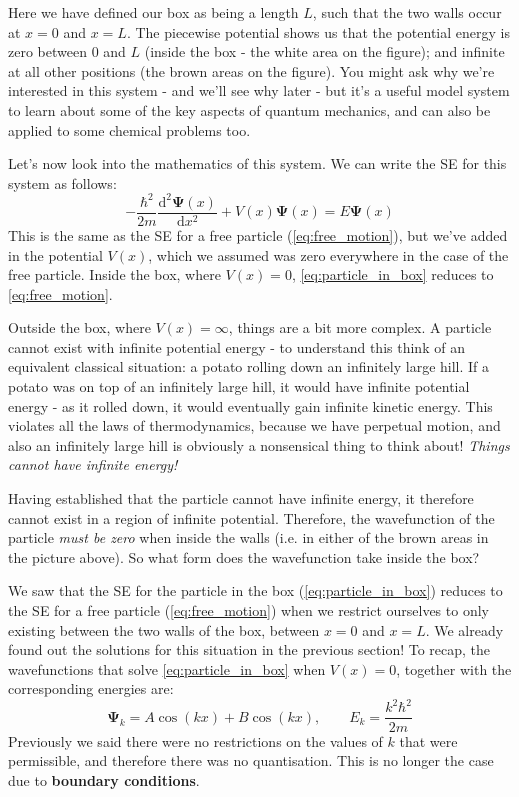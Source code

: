 \documentclass{memoir}[11pt,oneside,a4paper,openany]
\newcommand{\wf}{\ensuremath{\bm{\Psi}}\xspace}
\newcommand{\dd}{\ensuremath{\mathrm{d}}}
\begin{document}
Here we have defined our box as being a length $L$, such that the two walls occur at $x=0$ and $x=L$. The piecewise potential shows us that the potential energy is zero between $0$ and $L$ (inside the box - the white area on the figure); and infinite at all other positions (the brown areas on the figure). You might ask why we're interested in this system - and we'll see why later - but it's a useful model system to learn about some of the key aspects of quantum mechanics, and can also be applied to some chemical problems too. 

Let's now look into the mathematics of this system. We can write the SE for this system as follows:
\begin{equation}\label{eq:particle_in_box}
	-\frac{\hbar^2}{2m}\frac{\dd^2\wf(x)}{\dd x^2} + V(x)\wf(x) = E \wf(x)
\end{equation}
This is the same as the SE for a free particle (\autoref{eq:free_motion}), but we've added in the potential $V(x)$, which we assumed was zero everywhere in the case of the free particle. Inside the box, where $V(x)=0$, \autoref{eq:particle_in_box} reduces to \autoref{eq:free_motion}. 

Outside the box, where $V(x)=\infty$, things are a bit more complex. A particle cannot exist with infinite potential energy - to understand this think of an equivalent classical situation: a potato rolling down an infinitely large hill. If a potato was on top of an infinitely large hill, it would have infinite potential energy - as it rolled down, it would eventually gain infinite kinetic energy. This violates all the laws of thermodynamics, because we have perpetual motion, and also an infinitely large hill is obviously a nonsensical thing to think about! \emph{Things cannot have infinite energy!}

Having established that the particle cannot have infinite energy, it therefore cannot exist in a region of infinite potential. Therefore, the wavefunction of the particle \emph{must be zero} when inside the walls (i.e. in either of the brown areas in the picture above). So what form does the wavefunction take inside the box? 

We saw that the SE for the particle in the box (\autoref{eq:particle_in_box}) reduces to the SE for a free particle (\autoref{eq:free_motion}) when we restrict ourselves to only existing between the two walls of the box, between $x=0$ and $x=L$. We already found out the solutions for this situation in the previous section! To recap, the wavefunctions that solve \autoref{eq:particle_in_box} when $V(x)=0$, together with the corresponding energies are:
\begin{equation}\label{eq:pinbox_general}
	\wf_k = A\cos(kx) + B\cos(kx), \qquad E_k = \frac{k^2\hbar^2}{2m}
\end{equation}
Previously we said there were no restrictions on the values of $k$ that were permissible, and therefore there was no quantisation. This is no longer the case due to \textbf{boundary conditions}. 
\end{document}
